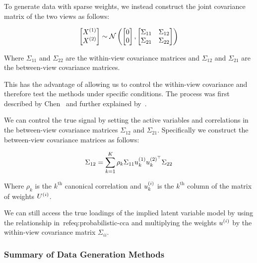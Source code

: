 To generate data with sparse weights, we instead construct the joint covariance matrix\citep{mai2019iterative,chen2013sparse} of the two views as follows:

\begin{align}\label{eq:covariance}
    \begin{bmatrix} X^{(1)} \\ X^{(2)} \end{bmatrix} \sim \mathcal{N} \left( \begin{bmatrix} 0 \\ 0 \end{bmatrix}, \begin{bmatrix} \Sigma_{11} & \Sigma_{12} \\ \Sigma_{21} & \Sigma_{22} \end{bmatrix} \right)
\end{align}

Where $\Sigma_{11}$ and $\Sigma_{22}$ are the within-view covariance matrices and $\Sigma_{12}$ and $\Sigma_{21}$ are the between-view covariance matrices.

This has the advantage of allowing us to control the within-view covariance and therefore test the methods under specific conditions.
The process was first described by Chen~\citep{chen2013sparse} and further explained by~\citep{suo2017sparse}.

We can control the true signal by setting the active variables and correlations in the between-view covariance matrices $\Sigma_{12}$ and $\Sigma_{21}$.
Specifically we construct the between-view covariance matrices as follows:

\begin{align}
    \Sigma_{12}=\sum_{k=1}^{K}\rho_k\Sigma_{11}u^{(1)}_{k}u^{(2)^{\top}}_k\Sigma_{22}
\end{align}

Where $\rho_k$ is the $k^{\text{th}}$ canonical correlation and $u^{(i)}_k$ is the $k^{\text{th}}$ column of the matrix of weights $U^{(i)}$.

We can still access the true loadings of the implied latent variable model by using the relationship in~ref{eq:probabilistic-cca} and multiplying the weights $u^{(i)}$ by the within-view covariance matrix $\Sigma_{ii}$.

\subsubsection{Summary of Data Generation Methods}

